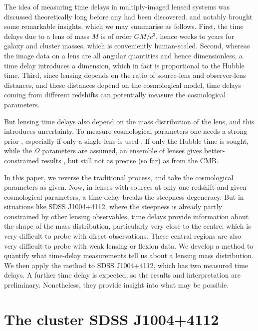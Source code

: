 \documentclass[
  11pt,
  twoside,
  openright,
  titlepage,
  headings=optiontoheadandtoc
]{scrbook}
\begin{document}
The idea of measuring time delays in multiply-imaged lensed systems
was discussed theoretically long before any had been discovered.
\cite{1964MNRAS.128..307R} and \cite{1966MNRAS.132..101R} notably brought some
remarkable insights, which we may summarise as follows.  First, the
time delays due to a lens of mass $M$ is of order $GM/c^3$, hence
weeks to years for galaxy and cluster masses, which is conveniently
human-scaled.  Second, whereas the image data on a lens are all
angular quantities and hence dimensionless, a time delay introduces a
dimension, which in fact is proportional to the Hubble time.  Third,
since lensing depends on the ratio of source-lens and observer-lens
distances, and these distances depend on the cosmological model, time
delays coming from different redshifts can potentially measure the
cosmological parameters.

But lensing time delays also depend on the mass distribution of the
lens, and this introduces uncertainty.  To measure cosmological
parameters one needs a strong prior \citep{2014MNRAS.437..600S},
especially if only a single lens is used \citep{2014ApJ...788L..35S}.
If only the Hubble time is sought, while the $\Omega$ parameters are
assumed, an ensemble of lenses gives better-constrained results
\citep{2006ApJ...650L..17S,2007ApJ...660....1O,
  2008ApJ...679...17C,2010ApJ...712.1378P,2014arXiv1404.2920R}, but
still not as precise (so far) as from the CMB.

In this paper, we reverse the traditional process, and take the
cosmological parameters as given.  Now, in lenses with sources at only
one redshift and given cosmological parameters, a time delay breaks
the steepness degeneracy.  But in situations like SDSS J1004+4112,
where the steepness is already partly constrained by other lensing
observables, time delays provide information about the shape of the
mass distribution, particularly very close to the centre, which is
very difficult to probe with direct observations. These central
regions are also very difficult to probe with weak lensing or flexion
data.
We develop a method to quantify what time-delay measurements tell us
about a lensing mass distribution.  We then apply the method to SDSS
J1004+4112, which has two measured time delays.  A further time delay
is expected, so the results and interpretation are preliminary.
Nonetheless, they provide insight into what may be possible.




\section{The cluster SDSS J1004+4112}
\end{document}
